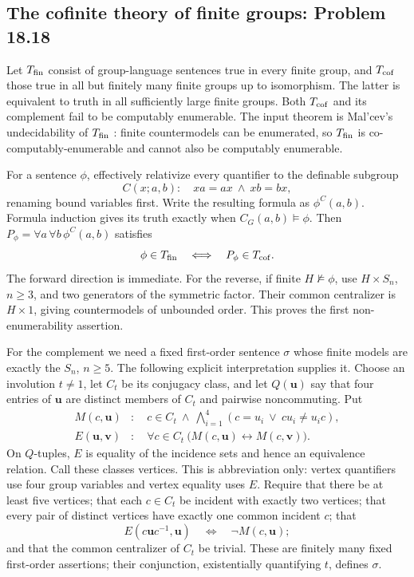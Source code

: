 \subsection{The cofinite theory of finite groups: Problem 18.18}
\label{cand:18.18}

Let \(T_{\rm fin}\) consist of group-language sentences true
in every finite group, and \(T_{\rm cof}\) those true in
all but finitely many finite groups up to isomorphism.
The latter is equivalent to truth in all sufficiently
large finite groups. Both \(T_{\rm cof}\) and its
complement fail to be computably enumerable.
The input theorem is Mal'cev's undecidability of
\(T_{\rm fin}\) \cite{malcev-finite}: finite
countermodels can be enumerated, so \(T_{\rm fin}\)
is co-computably-enumerable and cannot also be
computably enumerable.

For a sentence \(\phi\), effectively relativize every
quantifier to the definable subgroup
\[
 C(x;a,b):\quad xa=ax\ \wedge\ xb=bx,
\]
renaming bound variables first. Write the resulting
formula as \(\phi^C(a,b)\). Formula induction gives
its truth exactly when \(C_G(a,b)\models\phi\).
Then \(P_\phi=\forall a\,\forall b\,\phi^C(a,b)\)
satisfies
\[
 \phi\in T_{\rm fin}\quad\Longleftrightarrow\quad
 P_\phi\in T_{\rm cof}.
\]
The forward direction is immediate. For the reverse,
if finite \(H\not\models\phi\), use \(H\times S_n\),
\(n\geq3\), and two generators of the symmetric factor.
Their common centralizer is \(H\times1\), giving
countermodels of unbounded order. This proves the
first non-enumerability assertion.

For the complement we need a fixed first-order
sentence \(\sigma\) whose finite models are exactly
the \(S_n\), \(n\geq5\). The following explicit
interpretation supplies it. Choose an involution
\(t\ne1\), let \(C_t\) be its conjugacy class,
and let \(Q(\boldsymbol u)\) say that four entries
of \(\boldsymbol u\) are distinct members of \(C_t\)
and pairwise noncommuting. Put
\[
 \begin{split}
 M(c,\boldsymbol u)&:\quad c\in C_t\ \wedge\
   \bigwedge_{i=1}^4(c=u_i\ \vee\ cu_i\ne u_ic),\\
 E(\boldsymbol u,\boldsymbol v)&:\quad
   \forall c\in C_t\
   \bigl(M(c,\boldsymbol u)\leftrightarrow
                    M(c,\boldsymbol v)\bigr).
 \end{split}
\]
On \(Q\)-tuples, \(E\) is equality of the incidence
sets and hence an equivalence relation. Call these
classes vertices. This is abbreviation only:
vertex quantifiers use four group variables and
vertex equality uses \(E\).
Require that there be at least five vertices; that
each \(c\in C_t\) be incident with exactly two
vertices; that every pair of distinct vertices have
exactly one common incident \(c\); that
\[
 E(c\boldsymbol u c^{-1},\boldsymbol u)
       \quad\Longleftrightarrow\quad
       \neg M(c,\boldsymbol u);
\]
and that the common centralizer of \(C_t\) be trivial.
These are finitely many fixed first-order assertions;
their conjunction, existentially quantifying \(t\),
defines \(\sigma\).

